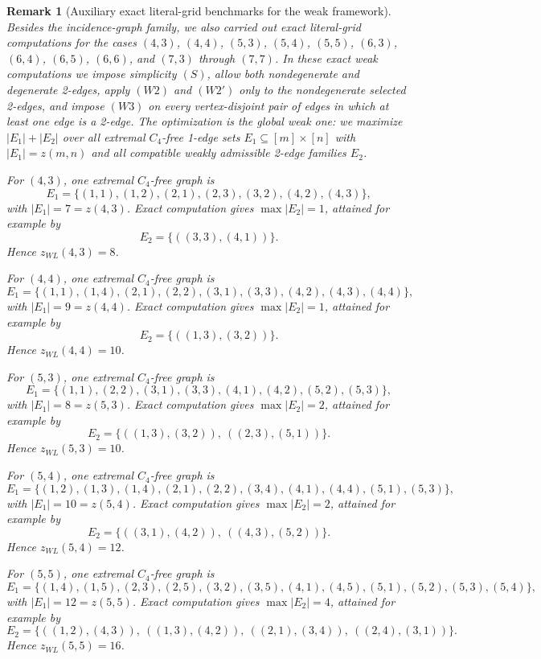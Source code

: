 \documentclass[10pt]{article}
\newcommand{\blue}[1]{#1}
\newcommand{\0}{\mathbf{0}}
\newcommand{\1}{\mathbf{1}}
\newtheorem{remark}[Thm]{Remark}
\begin{document}
\begin{remark}[\blue{Auxiliary exact literal-grid benchmarks for the weak framework}]
\blue{Besides the incidence-graph family, we also carried out exact literal-grid computations for the cases \((4,3)\), \((4,4)\), \((5,3)\), \((5,4)\), \((5,5)\), \((6,3)\), \((6,4)\), \((6,5)\), \((6,6)\), and \((7,3)\) through \((7,7)\). In these exact weak computations we impose simplicity \((S)\), allow both nondegenerate and degenerate 2-edges, apply \((W2)\) and \((W2')\) only to the nondegenerate selected 2-edges, and impose \((W3)\) on every vertex-disjoint pair of edges in which at least one edge is a 2-edge. The optimization is the global weak one: we maximize \(|E_1|+|E_2|\) over all extremal \(C_4\)-free 1-edge sets \(E_1\subseteq [m]\times[n]\) with \(|E_1|=z(m,n)\) and all compatible weakly admissible 2-edge families \(E_2\).}

\blue{For \((4,3)\), one extremal \(C_4\)-free graph is}
\[
\blue{E_1=\{(1,1),(1,2),(2,1),(2,3),(3,2),(4,2),(4,3)\},}
\]
\blue{with \(|E_1|=7=z(4,3)\). Exact computation gives \(\max |E_2|=1\), attained for example by}
\[
\blue{E_2=\{((3,3),(4,1))\}.}
\]
\blue{Hence \(z_{WL}(4,3)=8\).}

\blue{For \((4,4)\), one extremal \(C_4\)-free graph is}
\[
\blue{E_1=\{(1,1),(1,4),(2,1),(2,2),(3,1),(3,3),(4,2),(4,3),(4,4)\},}
\]
\blue{with \(|E_1|=9=z(4,4)\). Exact computation gives \(\max |E_2|=1\), attained for example by}
\[
\blue{E_2=\{((1,3),(3,2))\}.}
\]
\blue{Hence \(z_{WL}(4,4)=10\).}

\blue{For \((5,3)\), one extremal \(C_4\)-free graph is}
\[
\blue{E_1=\{(1,1),(2,2),(3,1),(3,3),(4,1),(4,2),(5,2),(5,3)\},}
\]
\blue{with \(|E_1|=8=z(5,3)\). Exact computation gives \(\max |E_2|=2\), attained for example by}
\[
\blue{E_2=\{((1,3),(3,2)),\ ((2,3),(5,1))\}.}
\]
\blue{Hence \(z_{WL}(5,3)=10\).}

\blue{For \((5,4)\), one extremal \(C_4\)-free graph is}
\[
\blue{E_1=\{(1,2),(1,3),(1,4),(2,1),(2,2),(3,4),(4,1),(4,4),(5,1),(5,3)\},}
\]
\blue{with \(|E_1|=10=z(5,4)\). Exact computation gives \(\max |E_2|=2\), attained for example by}
\[
\blue{E_2=\{((3,1),(4,2)),\ ((4,3),(5,2))\}.}
\]
\blue{Hence \(z_{WL}(5,4)=12\).}

\blue{For \((5,5)\), one extremal \(C_4\)-free graph is}
\[
\blue{E_1=\{(1,4),(1,5),(2,3),(2,5),(3,2),(3,5),(4,1),(4,5),(5,1),(5,2),(5,3),(5,4)\},}
\]
\blue{with \(|E_1|=12=z(5,5)\). Exact computation gives \(\max |E_2|=4\), attained for example by}
\[
\blue{E_2=\{((1,2),(4,3)),\ ((1,3),(4,2)),\ ((2,1),(3,4)),\ ((2,4),(3,1))\}.}
\]
\blue{Hence \(z_{WL}(5,5)=16\).}


\end{remark}
\end{document}
